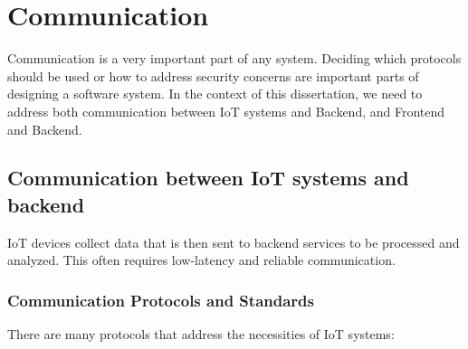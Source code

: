 \section{Communication}
Communication is a very important part of any system. Deciding which protocols
should be used or how to address security concerns are important parts of
designing a software system. In the context of this dissertation, we need to
address both communication between IoT systems and Backend, and Frontend and
Backend.


\subsection{Communication between IoT systems and backend}
IoT devices collect data that is then sent to backend services to be processed
and analyzed. This often requires low-latency and reliable communication.
\subsubsection{Communication Protocols and Standards}
There are many protocols that address the necessities of IoT systems:

